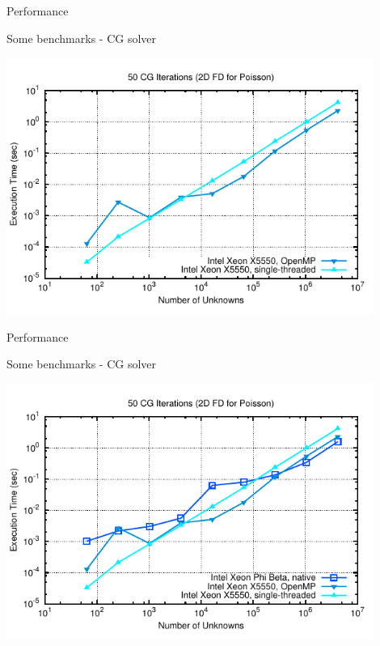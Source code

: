 \begin{frame}{Performance}
\begin{block}{Some benchmarks - CG solver}
  \begin{center}
   \includegraphics[width=0.9\textwidth]{figs/cg-timings-2}
  \end{center}
\end{block}
\end{frame}

\begin{frame}{Performance}
\begin{block}{Some benchmarks - CG solver}
  \begin{center}
   \includegraphics[width=0.9\textwidth]{figs/cg-timings-3}
  \end{center}
\end{block}
\end{frame}

